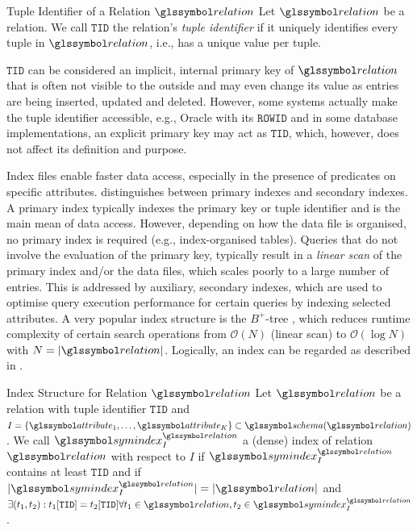 \begin{definition}[label=definition:tuple_identifier]{Tuple Identifier of a Relation $\relation$}{}
    Let $\relation$ be a relation. We call $\mathtt{TID}$ the relation's \emph{tuple identifier} if it uniquely identifies every tuple in $\relation$, i.e., has a unique value per tuple.
\end{definition}

$\mathtt{TID}$ can be considered an implicit, internal primary key of $\relation$ that is often not visible to the outside and may even change its value as entries are being inserted, updated and deleted. However, some systems actually make the tuple identifier accessible, e.g., Oracle with its $\mathtt{ROWID}$ and in some database implementations, an explicit primary key may act as $\mathtt{TID}$, which, however, does not affect its definition and purpose.

Index files enable faster data access, especially in the presence of predicates on specific attributes. \cite{Petrov:2019Database} distinguishes between primary indexes and secondary indexes. A primary index typically indexes the primary key or tuple identifier and is the main mean of data access. However, depending on how the data file is organised, no primary index is required (e.g., index-organised tables). Queries that do not involve the evaluation of the primary key, typically result in a \emph{linear scan} of the primary index and/or the data files, which scales poorly to a large number of entries. This is addressed by auxiliary, secondary indexes, which are used to optimise query execution performance for certain queries by indexing selected attributes. A very popular index structure is the $B^{+}$-tree \cite{Bayer:2002Organization}, which reduces runtime complexity of certain search operations from $\mathcal{O}(N)$ (linear scan) to $\mathcal{O}(\log N)$ with $N = |\relation|$. Logically, an index can be regarded as described in .

\begin{definition}[label=definition:index]{Index Structure for Relation $\relation$}{}
    Let $\relation$ be a relation with tuple identifier $\mathtt{TID}$ and $I = \{ \attribute_{1}, \ldots, \attribute_{K} \} \subset \schema (\relation)$. We call $\symindex^{\relation}_I$ a (dense) index of relation $\relation$ with respect to $I$ if $\symindex^{\relation}_I$ contains at least $\mathtt{TID}$ and if $|\symindex^{\relation}_I| = |\relation|$ and $\exists (t_1, t_2) : t_1[\mathtt{TID}] = t_2[\mathtt{TID}] \forall t_1 \in \relation, t_2 \in \symindex^{\relation}_I$.
\end{definition}

